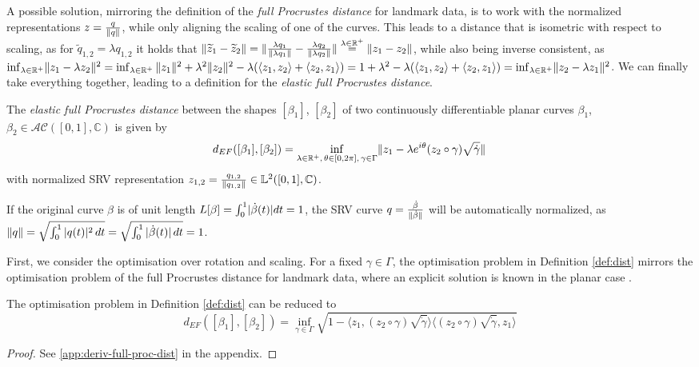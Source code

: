 A possible solution, mirroring the definition of the \emph{full Procrustes distance} for landmark data, is to work with the normalized representations $z = \frac{q}{\lVert q\rVert}$, while only aligning the scaling of one of the curves.
This leads to a distance that is isometric with respect to scaling, as for $\widetilde{q}_{1,2} = \lambda q_{1,2}$ it holds that $\lVert\widetilde z_1 - \widetilde z_2\rVert = \lVert \frac{\lambda q_1}{\lVert\lambda q_1\rVert} - \frac{\lambda q_2}{\lVert\lambda q_2\rVert}\rVert \overset{\lambda \in \mathbb{R}^+}{=} \lVert z_1 - z_2\rVert$, while also being inverse consistent, as $\inf_{\lambda \in \mathbb{R}^+} \lVert z_1 - \lambda z_2\rVert^2 = \inf_{\lambda \in \mathbb{R}^+}\,\lVert z_1\rVert^2 + \lambda^2 \lVert z_2\rVert^2 - \lambda (\langle z_1, z_2 \rangle + \langle z_2, z_1 \rangle) = 1 + \lambda^2 - \lambda (\langle z_1, z_2 \rangle + \langle z_2, z_1 \rangle) = \inf_{\lambda \in \mathbb{R}^+} \lVert z_2 - \lambda z_1\rVert^2$.
We can finally take everything together, leading to a definition for the \emph{elastic full Procrustes distance}.
\begin{definition}
  \label{def:dist}
  The \emph{elastic full Procrustes distance} between the shapes $[\beta_1]$, $[\beta_2]$ of two continuously differentiable planar curves $\beta_1$, $\beta_2 \in \mathcal{AC}([0,1],\mathbb{C})$  is given by 
    $$d_{EF}([\beta_1], [\beta_2]) = \inf_{\lambda \in \mathbb{R}^+,\, \theta \in
    [0,2\pi],\, \gamma \in \Gamma} \lVert z_1 - \lambda e^{i\theta} (z_2 \circ \gamma) \sqrt{\dot\gamma}\rVert\, $$
    with normalized SRV representation $z_{1,2} = \frac{q_{1,2}}{\lVert q_{1,2}\rVert} \in \mathbb{L}^2([0,1], \mathbb{C})$.
\end{definition}
\begin{remark}
  If the original curve $\beta$ is of unit length $L[\beta] = \int_0^1 \lvert\dot\beta(t)\rvert dt = 1$, the SRV curve $q = \frac{\dot\beta}{\lVert\dot\beta\rVert}$ will be automatically normalized, as $ \lVert q\rVert = \sqrt{ \int_0^1 |q(t)|^2 \, dt} = \sqrt{\int_0^1 |\dot{\beta}(t)| \, dt} = 1$.
\end{remark}

First, we consider the optimisation over rotation and scaling.
For a fixed $\gamma \in \Gamma$, the optimisation problem in Definition \ref{def:dist} mirrors the optimisation problem of the full Procrustes distance for landmark data, where an explicit solution is known in the planar case \parencite[see][Chapter~8]{DrydenMardia2016}.

\begin{lemma}
  The optimisation problem in Definition \ref{def:dist} can be reduced to
  $$ d_{EF}([\beta_1],[\beta_2]) = \inf_{\gamma \in \Gamma} \sqrt{ 1 - \langle z_1, (z_2 \circ \gamma) \sqrt{\dot\gamma} \rangle \langle (z_2 \circ \gamma) \sqrt{\dot\gamma}, z_1 \rangle }$$
  \begin{proof}
  See \ref{app:deriv-full-proc-dist} in the appendix.
  \end{proof}
\end{lemma}


